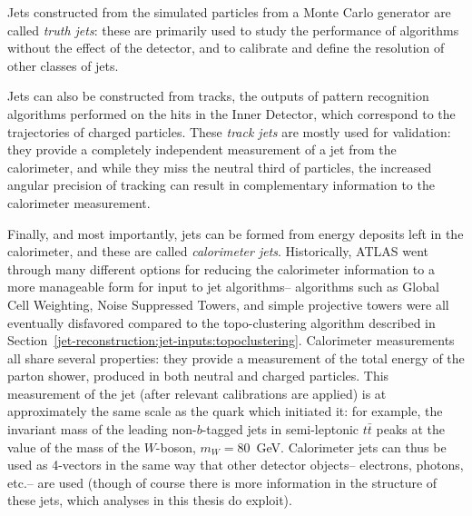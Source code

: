 
Jets constructed from the simulated particles from a Monte Carlo generator are called \textit{truth jets}: these are primarily used to study the performance of algorithms without the effect of the detector, and to calibrate and define the resolution of other classes of jets. 

Jets can also be constructed from tracks, the outputs of pattern recognition algorithms performed on the hits in the Inner Detector, which correspond to the trajectories of charged particles. These \textit{track jets} are mostly used for validation: they provide a completely independent measurement of a jet from the calorimeter, and while they miss the neutral third of particles, the increased angular precision of tracking can result in complementary information to the calorimeter measurement.  

Finally, and most importantly, jets can be formed from energy deposits left in the calorimeter, and these are called \textit{calorimeter jets}. Historically, ATLAS went through many different options for reducing the calorimeter information to a more manageable form for input to jet algorithms-- algorithms such as Global Cell Weighting, Noise Suppressed Towers, and simple projective towers were all eventually disfavored compared to the topo-clustering algorithm described in Section~\ref{jet-reconstruction:jet-inputs:topoclustering}. Calorimeter measurements all share several properties: they provide a measurement of the total energy of the parton shower, produced in both neutral and charged particles. This measurement of the jet (after relevant calibrations are applied) is at approximately the same scale as the quark which initiated it: for example, the invariant mass of the leading non-$b$-tagged jets in semi-leptonic $t\bar{t}$ peaks at the value of the mass of the $W$-boson, $m_{W} = 80$~GeV. Calorimeter jets can thus be used as 4-vectors in the same way that other detector objects-- electrons, photons, etc.-- are used (though of course there is more information in the structure of these jets, which analyses in this thesis do exploit).  

